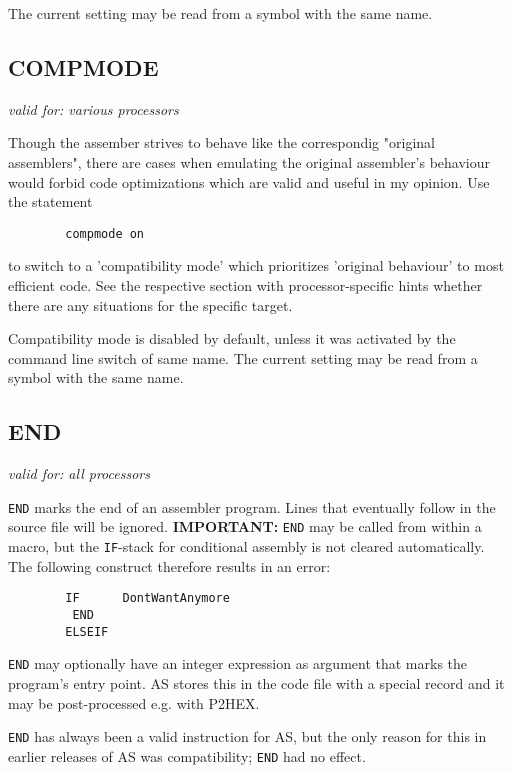 \documentclass[12pt,twoside]{report}
\makeatletter
\newcommand{\bb}[1]{{\bf #1}}
\newcommand{\tty}[1]{{\tt #1}}
\newcommand{\ttindex}[1]{\index{#1@{\tt #1}}}
\newcommand{\asname}{{AS}}
\makeatother
\begin{document}
The current setting may be read from a symbol with the same name.


\subsection{COMPMODE}
\label{SectCompMode}
\ttindex{COMPMODE}

{\em valid for: various processors}

Though the assember strives to behave like the correspondig "original
assemblers", there are cases when emulating the original assembler's
behaviour would forbid code optimizations which are valid and useful in
my opinion.  Use the statement
\begin{verbatim}
        compmode on
\end{verbatim}
to switch to a 'compatibility mode' which prioritizes 'original behaviour'
to most efficient code.  See the respective section with processor-specific
hints whether there are any situations for the specific target.
\par
Compatibility mode is disabled by default, unless it was activated by the
command line switch of same name.  The current setting may be read from a
symbol with the same name.


\subsection{END}
\ttindex{END}

{\em valid for: all processors}

\tty{END} marks the end of an assembler program.  Lines that eventually
follow in the source file will be ignored.  \bb{IMPORTANT:} \tty{END} may
be called from within a macro, but the \tty{IF}-stack for conditional
assembly is not cleared automatically.  The following construct therefore
results in an error:
\begin{verbatim}
        IF      DontWantAnymore
         END
        ELSEIF
\end{verbatim}
\tty{END} may optionally have an integer expression as argument that marks
the program's entry point.  \asname{} stores this in the code file with a special
record and it may be post-processed e.g. with P2HEX.

\tty{END} has always been a valid instruction for \asname{}, but the only reason
for this in earlier releases of \asname{} was compatibility; \tty{END} had no
effect.
\end{document}
